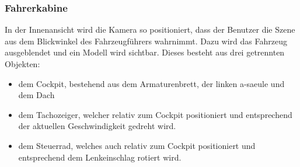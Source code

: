 \newpage
\subsubsection{Fahrerkabine}
In der Innenansicht wird die Kamera so positioniert, dass der Benutzer die Szene aus dem Blickwinkel des Fahrzeugführers wahrnimmt. Dazu wird das Fahrzeug ausgeblendet und ein Modell wird sichtbar. Dieses besteht aus drei getrennten Objekten:
\begin{itemize}
	\item dem Cockpit, bestehend aus dem Armaturenbrett, der linken \gls{a-saeule} und dem Dach
	\item dem Tachozeiger, welcher relativ zum Cockpit positioniert und entsprechend der aktuellen Geschwindigkeit gedreht wird.
	\item dem Steuerrad, welches auch relativ zum Cockpit positioniert und entsprechend dem Lenkeinschlag rotiert wird.
\end{itemize}

